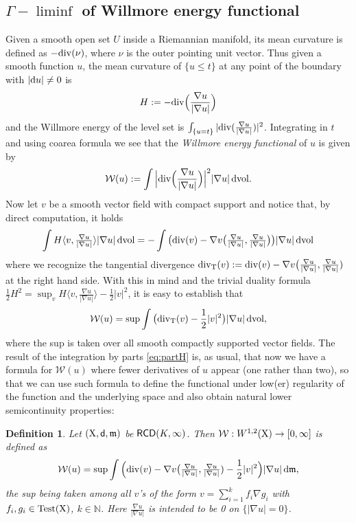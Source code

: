 \documentclass[11pt]{article}
\numberwithin{equation}{section}
\newtheorem{definition}[theorem]{Definition}
\newcommand{\N}{\mathbb{N}}
\newcommand{\X}{{\rm X}}
\newcommand{\sfd}{{\sf d}}
\newcommand{\mm}{{\mathfrak m}}
\newcommand{\vol}{{\rm vol}}								%
\newcommand{\RCD}{{\sf RCD}}
\renewcommand{\d}{{\rm d}}
\renewcommand{\div}{{\rm div}}
\newcommand\la{\langle}
\newcommand\ra{\rangle}
\newcommand{\WW}{\mathcal W}
\newcommand{\test}{{\rm Test}}
\begin{document}
\subsection{$\Gamma-\liminf$ of Willmore energy functional}\label{se:willmore}
Given a smooth open set $U$ inside a Riemannian manifold, its mean curvature is defined as $-\div(\nu)$, where $\nu$ is the outer pointing unit vector. Thus given a smooth function $u$, the mean curvature of $\{u\leq t\}$ at any point of the boundary with $|\d u|\neq 0$ is 
\[
H:=-\div\Big(\frac{\nabla u}{|\nabla u|}\Big)
\]
and the Willmore energy of the level set is $\int_{\{u=t\}}|\div(\frac{\nabla u}{|\nabla u|})|^2 $. Integrating in $t$ and using coarea formula we see that the \emph{Willmore energy functional} of $u$ is given by
\[
\WW(u):=\int\Big|\div\Big(\frac{\nabla u}{|\nabla u|}\Big)\Big|^2|\nabla u|\,\d\vol.
\]
Now let $v$ be a smooth vector field with compact support and notice that, by direct computation, it holds
\begin{equation}
\label{eq:partH}
\int H\la v,\tfrac{\nabla u}{|\nabla u|}\ra |\nabla u|\,\d\vol=-\int\big(\div(v)-\nabla v\big(\tfrac{\nabla u}{|\nabla u|},\tfrac{\nabla u}{|\nabla u|}\big)\big)|\nabla u|\,\d\vol
\end{equation}
where  we recognize the tangential divergence $\div_{\rm T}(v):=\div(v)-\nabla v\big(\tfrac{\nabla u}{|\nabla u|},\tfrac{\nabla u}{|\nabla u|})$ at the right hand side. With this in mind and the trivial  duality formula $\frac12H^2=\sup_v H\la v,\tfrac{\nabla u}{|\nabla u|} \ra-\frac12|v|^2$, it is easy to establish that
\[
\WW(u)=\sup\int \big(\div_{\rm T}(v)-\frac12|v|^2\big)|\nabla u|\,\d\vol,
\] 
where the sup is taken over all smooth compactly supported vector fields. The result of the integration by parts  \eqref{eq:partH} is, as usual, that now we have a formula for $\WW(u)$ where fewer  derivatives of $u$ appear (one rather than two), so that we can use such formula to define the functional under low(er) regularity of the function and the underlying space and also obtain natural lower semicontinuity properties: 
\begin{definition}
Let $(\X,\sfd,\mm)$ be $\RCD(K,\infty)$. Then $\WW:W^{1,2}(\X)\to[0,\infty]$ is defined as
\[
\WW(u)=\sup\int \Big(\div(v)-\nabla v\big(\tfrac{\nabla u}{|\nabla u|},\tfrac{\nabla u}{|\nabla u|})-\frac12|v|^2\Big)|\nabla u|\,\d\mm,
\]
 the sup being taken among all $v$'s  of the form $v=\sum_{i=1}^kf_i\nabla g_i$ with $f_i,g_i\in\test(\X)$, $k\in\N$. Here $\frac{\nabla u}{|\nabla u|}$ is intended to be 0 on $\{|\nabla u|=0\}$.
\end{definition}
\end{document}
